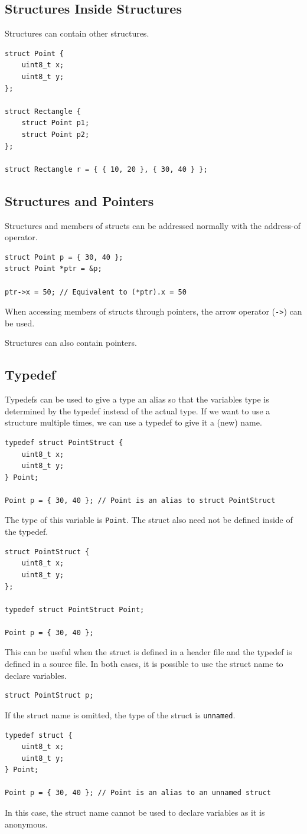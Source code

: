 \documentclass{report}
\begin{document}
\subsection{Structures Inside Structures}
Structures can contain other structures.
\begin{verbatim}
struct Point {
    uint8_t x;
    uint8_t y;
};

struct Rectangle {
    struct Point p1;
    struct Point p2;
};

struct Rectangle r = { { 10, 20 }, { 30, 40 } };
\end{verbatim}
\subsection{Structures and Pointers}
Structures and members of structs can be addressed normally with the address-of operator.
\begin{verbatim}
struct Point p = { 30, 40 };
struct Point *ptr = &p;

ptr->x = 50; // Equivalent to (*ptr).x = 50
\end{verbatim}
When accessing members of structs through pointers, the arrow operator (\texttt{->}) can be used.

Structures can also contain pointers.
\subsection{Typedef}
Typedefs can be used to give a type an alias so that the variables type is
determined by the typedef instead of the actual type.
If we want to use a structure multiple times, we can use a typedef to give it a (new) name.
\begin{verbatim}
typedef struct PointStruct {
    uint8_t x;
    uint8_t y;
} Point;

Point p = { 30, 40 }; // Point is an alias to struct PointStruct
\end{verbatim}
The type of this variable is \texttt{Point}.
The struct also need not be defined inside of the typedef.
\begin{verbatim}
struct PointStruct {
    uint8_t x;
    uint8_t y;
};

typedef struct PointStruct Point;

Point p = { 30, 40 };
\end{verbatim}
This can be useful when the struct is defined in a header file and the typedef is defined in a source file.
In both cases, it is possible to use the struct name to declare variables.
\begin{verbatim}
struct PointStruct p;
\end{verbatim}
If the struct name is omitted, the type of the struct is \texttt{unnamed}.
\begin{verbatim}
typedef struct {
    uint8_t x;
    uint8_t y;
} Point;

Point p = { 30, 40 }; // Point is an alias to an unnamed struct
\end{verbatim}
In this case, the struct name cannot be used to declare variables as it is anonymous.
\end{document}
